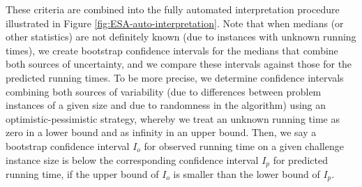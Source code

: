 \documentclass[aic]{iosart2x}
\begin{document}
These criteria are combined into the fully automated interpretation procedure illustrated in Figure \ref{fig:ESA-auto-interpretation}. Note that when medians (or other statistics) are not definitely known (due to instances with unknown running times), we create bootstrap confidence intervals for the medians that combine both sources of uncertainty, and we compare these intervals against those for the predicted running times. To be more precise, we determine confidence intervals combining both sources of variability (due to differences between problem instances of a given size and due to randomness in the algorithm) using an optimistic-pessimistic strategy, whereby we treat an unknown running time as zero in a lower bound and as infinity in an upper bound. Then, we say a bootstrap confidence interval $I_o$ for observed running time on a given challenge instance size is below the corresponding confidence interval $I_p$ for predicted running time, if the upper bound of $I_o$ is smaller than the lower bound of $I_p$.
\end{document}
